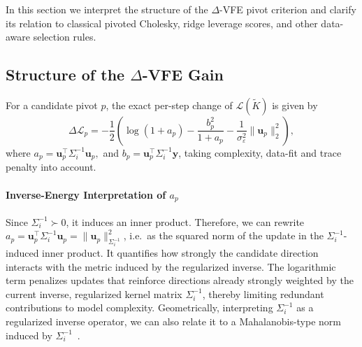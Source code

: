 \documentclass[onefignum,onetabnum]{siamart250211}
\begin{document}
In this section we interpret the structure of the $\Delta$-VFE pivot criterion and clarify its relation to classical pivoted Cholesky, ridge leverage scores, and other data-aware selection rules.

\subsection{Structure of the $\Delta$-VFE Gain}

For a candidate pivot $p$, the exact per-step change of $\mathcal{L}(\widetilde{K})$ is given by
\begin{equation*}
    \Delta\mathcal{L}_p = -\frac{1}{2}\left(\log(1+a_p)-\frac{b_p^2}{1+a_p} - \frac{1}{\sigma_\varepsilon^2} \|\bm{u}_p\|_2^2 \right),
\end{equation*}
where $a_p = \bm{u}_p^\top \Sigma_i^{-1} \bm{u}_p,$ and $b_p = \bm{u}_p^\top \Sigma_i^{-1} \bm{y}$, taking complexity, data-fit and trace penalty into account.

\paragraph{Inverse-Energy Interpretation of $a_p$}
Since $\Sigma_i^{-1} \succ 0$, it induces an inner product. Therefore, we can rewrite $a_p = \bm{u}_p^\top \Sigma_i^{-1} \bm{u}_p =  \|\bm{u}_p \|_{\Sigma_i^{-1}}^2$, i.e.~as the squared norm of the update in the $\Sigma_i^{-1}$-induced inner product. It quantifies how strongly the candidate direction interacts with the metric induced by the regularized inverse. The logarithmic term penalizes updates that reinforce directions already strongly weighted by the current inverse, regularized kernel matrix $\Sigma_i^{-1}$, thereby limiting redundant contributions to model complexity. 
Geometrically, interpreting $\Sigma_i^{-1}$ as a regularized inverse operator, we can also relate it to a Mahalanobis-type norm induced by $\Sigma_i^{-1}$~\cite{bishop.2006, christmann.2008}.
\end{document}
